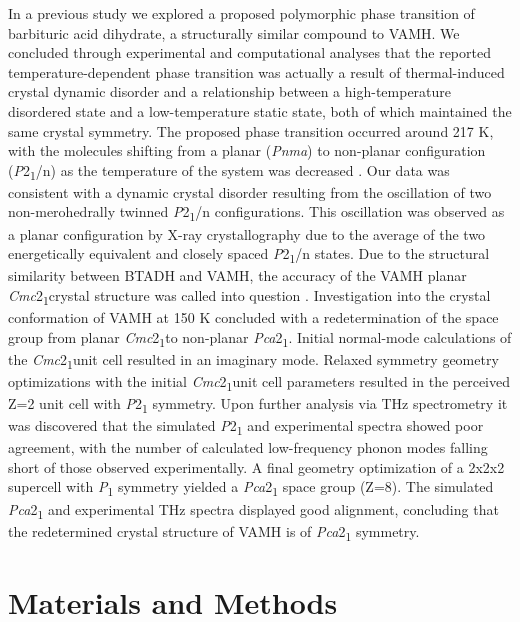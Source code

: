 In a previous study we explored a proposed polymorphic phase transition of barbituric acid dihydrate, a structurally similar compound to VAMH. We concluded through experimental and computational analyses that the reported temperature-dependent phase transition was actually a result of thermal-induced crystal dynamic disorder and a relationship between a high-temperature disordered state and a low-temperature static state, both of which maintained the same crystal symmetry. The proposed phase transition occurred around 217 K, with the molecules shifting from a planar (\textit{Pnma}) to non-planar configuration (\textit{P}2\textsubscript{1}/n) as the temperature of the system was decreased \citep{nichol_btadh_2005,Jeffrey1961,Al-Karaghouli}. Our data was consistent with a dynamic crystal disorder resulting from the oscillation of two non-merohedrally twinned \textit{P}2\textsubscript{1}/n configurations. This oscillation was observed as a planar configuration by X-ray crystallography due to the average of the two energetically equivalent and closely spaced \textit{P}2\textsubscript{1}/n states. Due to the structural similarity between BTADH and VAMH, the accuracy of the VAMH planar \textit{Cmc}2\textsubscript{1}crystal structure was called into question \citep{paul_true_2019}.
Investigation into the crystal conformation of VAMH at 150 K concluded with a redetermination of the space group from planar \textit{Cmc}2\textsubscript{1}to non-planar \textit{Pca}2\textsubscript{1}. Initial normal-mode calculations of the \textit{Cmc}2\textsubscript{1}unit cell resulted in an imaginary mode. Relaxed symmetry geometry optimizations with the initial \textit{Cmc}2\textsubscript{1}unit cell parameters resulted in the perceived Z=2 unit cell with \textit{P}2\textsubscript{1} symmetry. Upon further analysis via THz spectrometry it was discovered that the simulated \textit{P}2\textsubscript{1} and experimental spectra showed poor agreement, with the number of calculated low-frequency phonon modes falling short of those observed experimentally. A final geometry optimization of a 2x2x2 supercell with \textit{P}\textsubscript{1} symmetry yielded a \textit{Pca}2\textsubscript{1} space group (Z=8). The simulated \textit{Pca}2\textsubscript{1} and experimental THz spectra displayed good alignment, concluding that the redetermined crystal structure of VAMH is of \textit{Pca}2\textsubscript{1} symmetry. 

\section{Materials and Methods}
